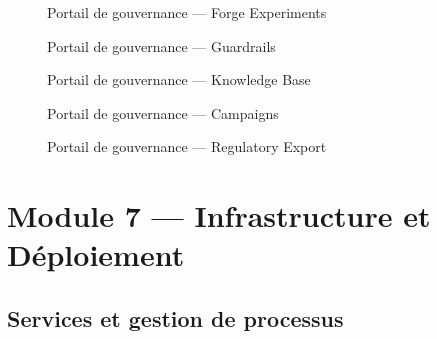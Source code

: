 \begin{figure}[H]
  \centering
  \caption{Portail de gouvernance — Forge Experiments}
  \label{fig:screen_forge}
\end{figure}

\begin{figure}[H]
  \centering
  \caption{Portail de gouvernance — Guardrails}
  \label{fig:screen_guardrails}
\end{figure}

\begin{figure}[H]
  \centering
  \caption{Portail de gouvernance — Knowledge Base}
  \label{fig:screen_kb}
\end{figure}

\begin{figure}[H]
  \centering
  \caption{Portail de gouvernance — Campaigns}
  \label{fig:screen_campaigns}
\end{figure}

\begin{figure}[H]
  \centering
  \caption{Portail de gouvernance — Regulatory Export}
  \label{fig:screen_regulatory}
\end{figure}

\section{Module 7 — Infrastructure et Déploiement}

\subsection{Services et gestion de processus}

